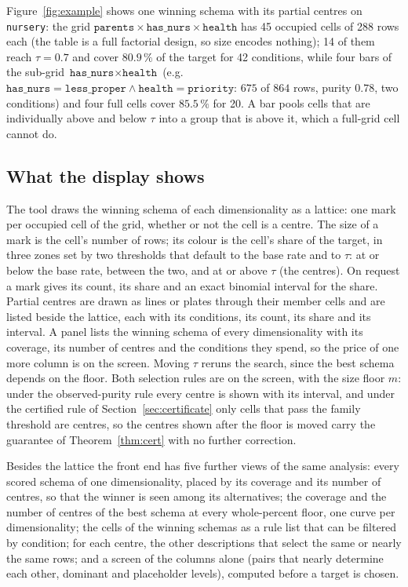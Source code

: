 \documentclass[11pt]{article}
\begin{document}
Figure~\ref{fig:example} shows one winning schema with its partial centres on \texttt{nursery}: the grid $\texttt{parents}\times\texttt{has\_nurs}\times\texttt{health}$ has 45 occupied cells of 288 rows each (the table is a full factorial design, so size encodes nothing); 14 of them reach $\tau=0.7$ and cover $80.9\,\%$ of the target for 42 conditions, while four bars of the sub-grid $\texttt{has\_nurs}\times\texttt{health}$ (e.g.\ $\texttt{has\_nurs}=\texttt{less\_proper}\wedge\texttt{health}=\texttt{priority}$: $675$ of $864$ rows, purity $0.78$, two conditions) and four full cells cover $85.5\,\%$ for 20. A bar pools cells that are individually above and below $\tau$ into a group that is above it, which a full-grid cell cannot do.

\subsection{What the display shows}\label{sec:display}
The tool draws the winning schema of each dimensionality as a lattice: one mark per occupied cell of the grid, whether or not the cell is a centre. The size of a mark is the cell's number of rows; its colour is the cell's share of the target, in three zones set by two thresholds that default to the base rate and to $\tau$: at or below the base rate, between the two, and at or above $\tau$ (the centres). On request a mark gives its count, its share and an exact binomial interval for the share. Partial centres are drawn as lines or plates through their member cells and are listed beside the lattice, each with its conditions, its count, its share and its interval. A panel lists the winning schema of every dimensionality with its coverage, its number of centres and the conditions they spend, so the price of one more column is on the screen. Moving $\tau$ reruns the search, since the best schema depends on the floor. Both selection rules are on the screen, with the size floor $m$: under the observed-purity rule every centre is shown with its interval, and under the certified rule of Section~\ref{sec:certificate} only cells that pass the family threshold are centres, so the centres shown after the floor is moved carry the guarantee of Theorem~\ref{thm:cert} with no further correction.

Besides the lattice the front end has five further views of the same analysis: every scored schema of one dimensionality, placed by its coverage and its number of centres, so that the winner is seen among its alternatives; the coverage and the number of centres of the best schema at every whole-percent floor, one curve per dimensionality; the cells of the winning schemas as a rule list that can be filtered by condition; for each centre, the other descriptions that select the same or nearly the same rows; and a screen of the columns alone (pairs that nearly determine each other, dominant and placeholder levels), computed before a target is chosen.
\end{document}

